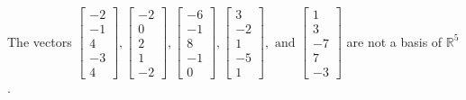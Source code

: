 \begin{exercise}
\begin{exerciseStatement}
  \end{exerciseStatement}
  \begin{exerciseAnswer}
   The vectors \(\left[\begin{array}{r}
-2 \\
-1 \\
4 \\
-3 \\
4
\end{array}\right] , \left[\begin{array}{r}
-2 \\
0 \\
2 \\
1 \\
-2
\end{array}\right] , \left[\begin{array}{r}
-6 \\
-1 \\
8 \\
-1 \\
0
\end{array}\right] , \left[\begin{array}{r}
3 \\
-2 \\
1 \\
-5 \\
1
\end{array}\right] , \text{ and } \left[\begin{array}{r}
1 \\
3 \\
-7 \\
7 \\
-3
\end{array}\right]\) 
  	 are not  a basis of \(\mathbb{R}^5\).
  


  \end{exerciseAnswer}
\end{exercise}